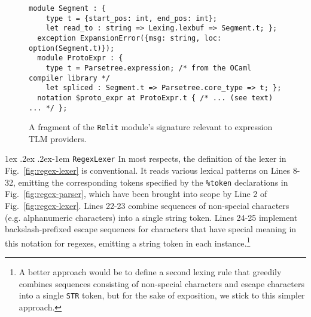 \documentclass[acmsmall]{acmart}
\makeatletter
\renewcommand{\subsubsection}{%
  \@startsection{subsubsection}{3}%
  {\z@}{1ex \@plus .2ex \@minus .2ex}{-1em}%
  {\normalfont\normalsize\bfseries}%
}
\newcommand{\li}[1]{\lstinline[basicstyle=\ttfamily\fontsize{9pt}{1em}\selectfont]{#1}}
\makeatother
\begin{document}
\begin{figure}
\begin{lstlisting}[deletekeywords={spliced}]
  module Segment : { 
    type t = {start_pos: int, end_pos: int};
    let read_to : string => Lexing.lexbuf => Segment.t; };
  exception ExpansionError({msg: string, loc: option(Segment.t)});
  module ProtoExpr : { 
    type t = Parsetree.expression; /* from the OCaml compiler library */
    let spliced : Segment.t => Parsetree.core_type => t; };
  notation $proto_expr at ProtoExpr.t { /* ... (see text) ... */ };
\end{lstlisting}
\vspace{-2px}
\caption{A fragment of the \li{Relit} module's signature relevant to expression TLM providers.}
\label{fig:relit-util}
\vspace{-5px}
\end{figure}

\subsubsection{\li{RegexLexer}}
\label{sec:regex-lexer}
In most respects, the definition of the lexer in Fig.~\ref{fig:regex-lexer} is conventional. It reads various lexical patterns on Lines 8-32, emitting the corresponding tokens specified by the \lstinline[morekeywords={token}]{%token} declarations in Fig.~\ref{fig:regex-parser}, which have been brought into scope by Line 2 of Fig.~\ref{fig:regex-lexer}. Lines 22-23 combine sequences of non-special characters (e.g. alphanumeric characters) into a single string token. Lines 24-25 implement backslash-prefixed escape sequences for characters that have special meaning in this notation for regexes, emitting a string token in each instance.\footnote{A better approach would be to define a second lexing rule that greedily combines sequences consisting of non-special characters and escape characters into a single \li{STR} token, but for the sake of exposition, we stick to this simpler approach.}  
\end{document}
